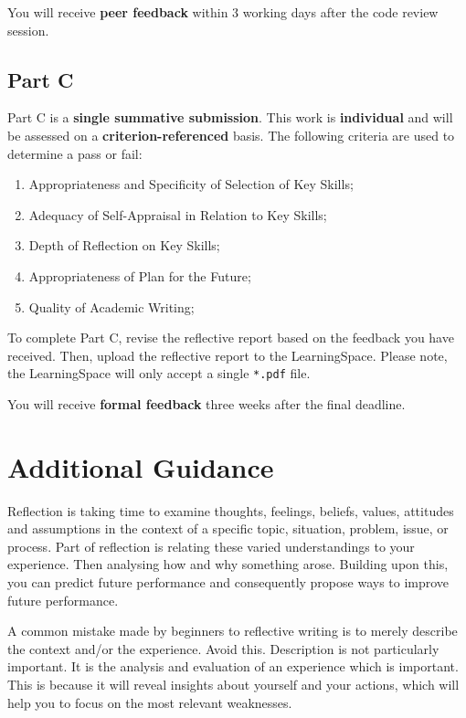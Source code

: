 \documentclass{../fal_assignment}
\begin{document}
You will receive \textbf{peer feedback} within 3 working days after the code review session.

\subsection*{Part C}

Part C is a \textbf{single summative submission}. This work is \textbf{individual} and will be assessed on a \textbf{criterion-referenced} basis. The following criteria are used to determine a pass or fail:

\begin{enumerate}[label=(\alph*)]
	\item Appropriateness and Specificity of Selection of Key Skills;
	\item Adequacy of Self-Appraisal in Relation to Key Skills;
	\item Depth of Reflection on Key Skills;
	\item Appropriateness of Plan for the Future;
	\item Quality of Academic Writing;
\end{enumerate}

To complete Part C, revise the reflective report based on the feedback you have received. Then, upload the reflective report to the LearningSpace. Please note, the LearningSpace will only accept a single \texttt{*.pdf} file.

You will receive \textbf{formal feedback} three weeks after the final deadline.

\section*{Additional Guidance}

Reflection is taking time to examine thoughts, feelings, beliefs, values, attitudes and assumptions in the context of a specific topic, situation, problem, issue, or process. Part of reflection is relating these varied understandings to your experience. Then analysing how and why something arose. Building upon this, you can predict future performance and consequently propose ways to improve future performance.

A common mistake made by beginners to reflective writing is to merely describe the context and/or the experience. Avoid this. Description is not particularly important. It is the analysis and evaluation of an experience which is important. This is because it will reveal insights about yourself and your actions, which will help you to focus on the most relevant weaknesses.
\end{document}
